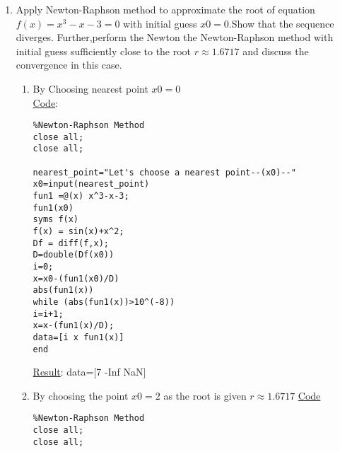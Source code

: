 \documentclass{article}
\begin{document}
\begin{enumerate}
\begin{enumerate}
\begin{lstlisting}
end           

\end{lstlisting}
\underline{Result}: data=[4.0000    0.6366    1.0000    0.6367   -0.0000]

\item \textbf{Regula-Falsi Method}\\
\underline{Code}:
\begin{lstlisting}
%Regula-falsi method
close all;
close all;
upper_bound="Let's choose an upper bound--(a1)--"
a1=input(upper_bound)
lower_bound="Let's choose an lower bound--(b1)--"
b1=input(lower_bound)
fun1=@(x) sin(x)+x^2-1;
x=a1-(fun1(a1)*((b1-a1)/(fun1(b1)-fun1(a1))))
i=0;
data=[i a1 b1 x fun1(x)];
while (abs(fun1(x)) > 10^(-4))
if fun1(a1)*fun1(x)<0
    b1=x;
else
    a1=x;
end
i=i+1;
x=a1-(fun1(a1)*((b1-a1)/(fun1(b1)-fun1(a1))))
data=[i a1 b1 x fun1(x)]

end
\end{lstlisting}
\underline{Result}: data=[4.0000    1.0000    0.6366    0.6367   -0.0000]

\item \textbf{Fixed-point Iteration Method}\\
\underline{Code}:
\begin{lstlisting}
%Fixed-point Iteration Method
close all;
close all;
upper_bound="Let's choose any number--(x0)--"
x0=input(upper_bound)
fun1=@(x) sin(x)+x^2-1.0;
g=@(x) sqrt(1-sin(x));
i=0;
fun1(x0)
x1=g(x0);
data=[i x1 fun1(x1)]
while (abs(fun1(x0))>10^(-4))
x0=g(x0)
x1=g(x0)
i=i+1;
data=[i  x1   fun1(x1)]
end
   
\end{lstlisting}
\underline{Result}: data=[20.0000    0.6367   -0.0000]
\end{enumerate}
\item Apply Newton-Raphson method to approximate the root of equation $f(x)=x^3-x-3=0$ with initial guess $x0=0$.Show that the sequence diverges. Further,perform the Newton the Newton-Raphson method with initial guess sufficiently close to the root $r\approx1.6717$ and discuss the convergence in this case.
\begin{enumerate}
\item By Choosing nearest point $x0=0$\\
\underline{Code}:
\begin{lstlisting}
%Newton-Raphson Method
close all;
close all;

nearest_point="Let's choose a nearest point--(x0)--"
x0=input(nearest_point)
fun1 =@(x) x^3-x-3;
fun1(x0)
syms f(x)
f(x) = sin(x)+x^2;
Df = diff(f,x);
D=double(Df(x0))
i=0;
x=x0-(fun1(x0)/D)
abs(fun1(x))
while (abs(fun1(x))>10^(-8))
i=i+1;
x=x-(fun1(x)/D);
data=[i x fun1(x)]
end
\end{lstlisting}
\underline{Result}: data=[7  -Inf   NaN]
\item By choosing the point $x0=2$ as the root is given $r\approx 1.6717$
\underline{Code}
\begin{lstlisting}
%Newton-Raphson Method
close all;
close all;


\end{lstlisting}
\end{enumerate}
\end{enumerate}
\end{document}
